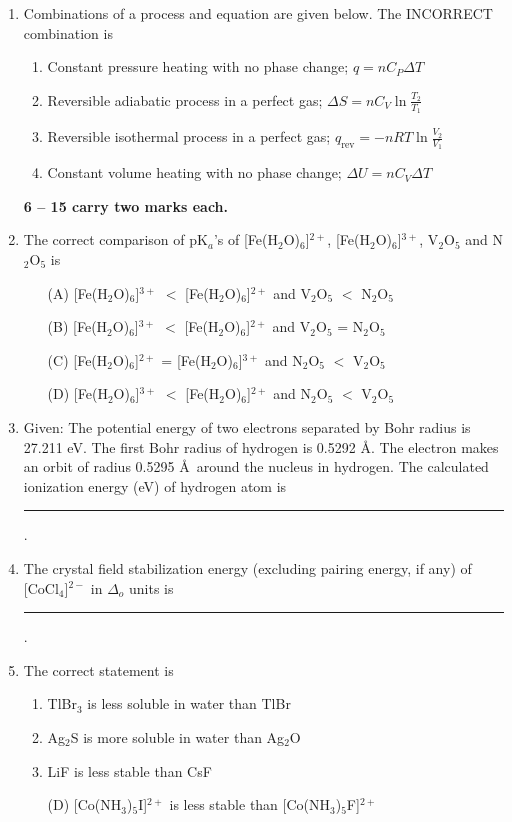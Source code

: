 \documentclass[journal,12pt,onecolumn]{IEEEtran}
\begin{document}
\begin{enumerate}[label=\arabic*.]
\item Combinations of a process and equation are given below. The INCORRECT combination is
\begin{enumerate}[label=(\Alph*)]
\item Constant pressure heating with no phase change; $q = nC_P\Delta T$
\item Reversible adiabatic process in a perfect gas; $\Delta S = nC_V\ln\frac{T_2}{T_1}$
\item Reversible isothermal process in a perfect gas; $q_{\text{rev}} = -nRT\ln\frac{V_2}{V_1}$
\item Constant volume heating with no phase change; $\Delta U = nC_V\Delta T$
\end{enumerate}

\noindent \textbf{ 6 --  15 carry two marks each.}

\item The correct comparison of pK$_a$’s of [Fe(H$_2$O)$_6$]$^{2+}$, [Fe(H$_2$O)$_6$]$^{3+}$, V$_2$O$_5$ and N$_2$O$_5$ is
\begin{enumerate}[label=(\Alph*)]
\item[(A)] [Fe(H$_2$O)$_6$]$^{3+}$ $<$ [Fe(H$_2$O)$_6$]$^{2+}$ and V$_2$O$_5$ $<$ N$_2$O$_5$
\item[(B)] [Fe(H$_2$O)$_6$]$^{3+}$ $<$ [Fe(H$_2$O)$_6$]$^{2+}$ and V$_2$O$_5$ = N$_2$O$_5$
\item[(C)] [Fe(H$_2$O)$_6$]$^{2+}$ = [Fe(H$_2$O)$_6$]$^{3+}$ and N$_2$O$_5$ $<$ V$_2$O$_5$
\item[(D)] [Fe(H$_2$O)$_6$]$^{3+}$ $<$ [Fe(H$_2$O)$_6$]$^{2+}$ and N$_2$O$_5$ $<$ V$_2$O$_5$
\end{enumerate}

\item Given: The potential energy of two electrons separated by Bohr radius is 27.211 eV. The first Bohr radius of hydrogen is 0.5292 \AA. The electron makes an orbit of radius 0.5295 \AA\ around the nucleus in hydrogen.  The calculated ionization energy (eV) of hydrogen atom is \rule{2.5cm}{0.1pt}.

\item The crystal field stabilization energy (excluding pairing energy, if any) of [CoCl$_4$]$^{2-}$ in $\Delta_o$ units is \rule{2.5cm}{0.1pt}.

\item The correct statement is
\begin{enumerate}[label=(\Alph*)]
\item TlBr$_3$ is less soluble in water than TlBr
\item Ag$_2$S is more soluble in water than Ag$_2$O
\item LiF is less stable than CsF
\item [(D)][Co(NH$_3$)$_5$I]$^{2+}$ is less stable than [Co(NH$_3$)$_5$F]$^{2+}$
\end{enumerate}


\end{enumerate}
\end{document}
